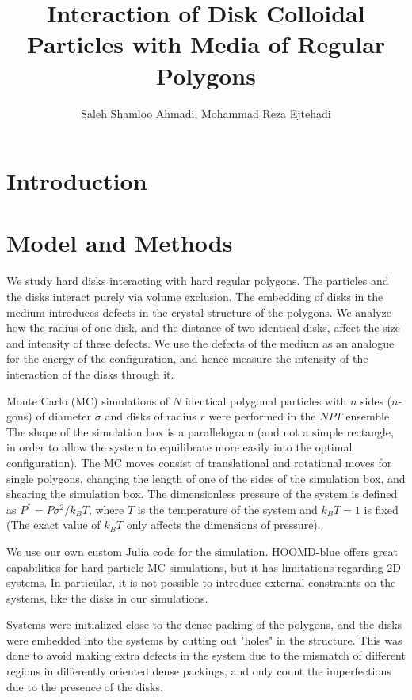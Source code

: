 \documentclass[12pt,a4paper]{article}
\title{Interaction of Disk Colloidal Particles with Media of Regular Polygons}
\author{Saleh Shamloo Ahmadi, Mohammad Reza Ejtehadi}
\begin{document}
	\maketitle
	\begin{abstract}
		
	\end{abstract}
	\section{Introduction}
	\section{Model and Methods}
	We study hard disks interacting with hard regular polygons. The particles and the disks interact
	purely via volume exclusion. The embedding of disks in the medium introduces defects in the
	crystal structure of the polygons. We analyze how the radius of one disk, and the distance of
	two identical disks, affect the size and intensity of these defects. We use the defects of the
	medium as an analogue for the energy of the configuration, and hence measure the intensity of
	the interaction of the disks through it.

	Monte Carlo (MC) simulations of $N$ identical polygonal particles with $n$ sides ($n$-gons) of
	diameter $\sigma$ and disks of radius $r$ were performed in the $NPT$ ensemble. The shape of the
	simulation box is a parallelogram (and not a simple rectangle, in order to allow the system to
	equilibrate more easily into the optimal configuration). The MC moves consist of translational
	and rotational moves for single polygons, changing the length of one of the sides of the
	simulation box, and shearing the simulation box. The dimensionless pressure of the system is
	defined as $P^*=P\sigma^2/k_BT$, where $T$ is the temperature of the system and $k_BT = 1$ is
	fixed (The exact value of $k_BT$ only affects the dimensions of pressure).

	We use our own custom Julia code for the simulation. HOOMD-blue offers great capabilities for
	hard-particle MC simulations, but it has limitations regarding 2D systems. In particular, it is
	not possible to introduce external constraints on the systems, like the disks in our
	simulations.

	Systems were initialized close to the dense packing of the polygons, and the disks were embedded
	into the systems by cutting out "holes" in the structure. This was done to avoid making extra
	defects in the system due to the mismatch of different regions in differently oriented dense
	packings, and only count the imperfections due to the presence of the disks.
\end{document}
